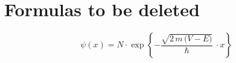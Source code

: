 \chapter{Formulas to be deleted}

\begin{equation}
\psi(x) = N \cdot \exp\!\left\{ -\frac{\sqrt{2\,m\,\bigl(V - E\bigr)}}{\hbar}\, \cdot x \right\}
\end{equation}
